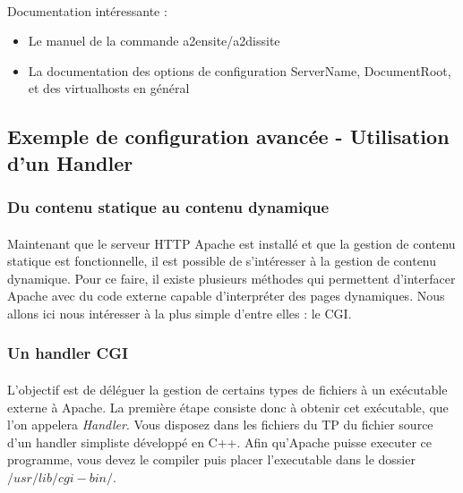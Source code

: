 \documentclass[12pt,a4paper]{article}
\begin{document}
\paragraph{}
Documentation intéressante : 
\begin{itemize}
\item Le manuel de la commande a2ensite/a2dissite
\item La documentation des options de configuration ServerName, DocumentRoot, et des virtualhosts en général
\end{itemize}

\subsection{Exemple de configuration avancée - Utilisation d'un Handler}

\subsubsection{Du contenu statique au contenu dynamique}

\paragraph{}
Maintenant que le serveur HTTP Apache est installé et que la gestion de contenu statique est fonctionnelle, il est possible de s'intéresser à la gestion de contenu dynamique. Pour ce faire, il existe plusieurs méthodes qui permettent d'interfacer Apache avec du code externe capable d'interpréter des pages dynamiques. Nous allons ici nous intéresser à la plus simple d'entre elles : le CGI.

\subsubsection{Un handler CGI}

\paragraph{}
L'objectif est de déléguer la gestion de certains types de fichiers à un exécutable externe à Apache. La première étape consiste donc à obtenir cet exécutable, que l'on appelera \textit{Handler}. Vous disposez dans les fichiers du TP du fichier source d'un handler simpliste développé en C++. Afin qu'Apache puisse executer ce programme, vous devez le compiler puis placer l'executable dans le dossier $/usr/lib/cgi-bin/$.
\end{document}
